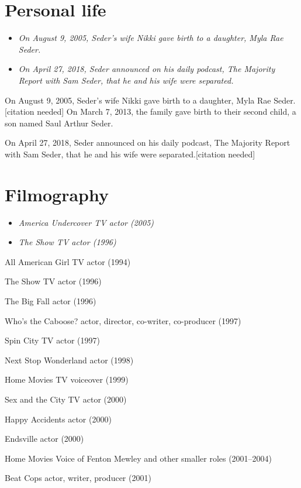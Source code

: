 \section{Personal life}\label{personal-life}

\begin{itemize}
\item
  \emph{On August 9, 2005, Seder's wife Nikki gave birth to a daughter,
  Myla Rae Seder.}
\item
  \emph{On April 27, 2018, Seder announced on his daily podcast, The
  Majority Report with Sam Seder, that he and his wife were separated.}
\end{itemize}

On August 9, 2005, Seder's wife Nikki gave birth to a daughter, Myla Rae
Seder.{[}citation needed{]} On March 7, 2013, the family gave birth to
their second child, a son named Saul Arthur Seder.

On April 27, 2018, Seder announced on his daily podcast, The Majority
Report with Sam Seder, that he and his wife were separated.{[}citation
needed{]}

\section{Filmography}\label{filmography}

\begin{itemize}
\item
  \emph{America Undercover TV actor (2005)}
\item
  \emph{The Show TV actor (1996)}
\end{itemize}

All American Girl TV actor (1994)

The Show TV actor (1996)

The Big Fall actor (1996)

Who's the Caboose? actor, director, co-writer, co-producer (1997)

Spin City TV actor (1997)

Next Stop Wonderland actor (1998)

Home Movies TV voiceover (1999)

Sex and the City TV actor (2000)

Happy Accidents actor (2000)

Endsville actor (2000)

Home Movies Voice of Fenton Mewley and other smaller roles (2001--2004)

Beat Cops actor, writer, producer (2001)


